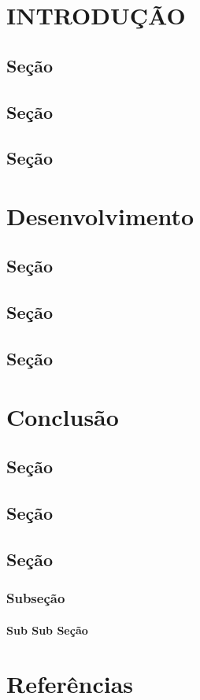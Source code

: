 \documentclass[oneside,12pt]{abntex2}
\begin{document}
	\listoffigures*
	\cleardoublepage

	
	\listoftables*
	\cleardoublepage
	
	\tableofcontents*
	\cleardoublepage

	
	\chapter{INTRODUÇÃO}
		\section{Seção}
		\section{Seção}
		\section{Seção}
	\chapter{Desenvolvimento}
		\section{Seção}
			\subsection{}
		\section{Seção}
		\section{Seção}
	\chapter{Conclusão}
	\section{Seção}
	\subsection{}
		\section{Seção}
		\section{Seção}
			\subsection{Subseção}
				\subsubsection{Sub Sub Seção}
	\chapter{Referências}
\end{document}
